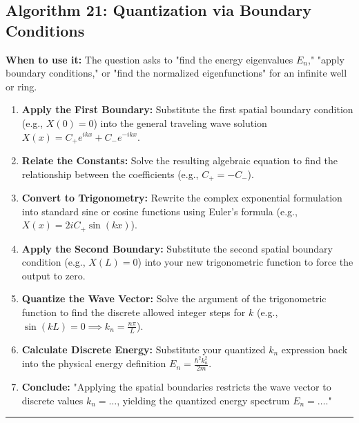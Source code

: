 \documentclass[11pt, a4paper]{report}
\begin{document}
\subsection*{Algorithm 21: Quantization via Boundary Conditions}
\textbf{When to use it:} The question asks to "find the energy eigenvalues $E_n$," "apply boundary conditions," or "find the normalized eigenfunctions" for an infinite well or ring.
\begin{enumerate}[label=\textbf{\arabic*.}]
    \item \textbf{Apply the First Boundary:} Substitute the first spatial boundary condition (e.g., $X(0) = 0$) into the general traveling wave solution $X(x) = C_+ e^{ikx} + C_- e^{-ikx}$.
    \item \textbf{Relate the Constants:} Solve the resulting algebraic equation to find the relationship between the coefficients (e.g., $C_+ = -C_-$).
    \item \textbf{Convert to Trigonometry:} Rewrite the complex exponential formulation into standard sine or cosine functions using Euler's formula (e.g., $X(x) = 2iC_+\sin(kx)$).
    \item \textbf{Apply the Second Boundary:} Substitute the second spatial boundary condition (e.g., $X(L) = 0$) into your new trigonometric function to force the output to zero.
    \item \textbf{Quantize the Wave Vector:} Solve the argument of the trigonometric function to find the discrete allowed integer steps for $k$ (e.g., $\sin(kL) = 0 \implies k_n = \frac{n\pi}{L}$).
    \item \textbf{Calculate Discrete Energy:} Substitute your quantized $k_n$ expression back into the physical energy definition $E_n = \frac{\hbar^2 k_n^2}{2m}$.
    \item \textbf{Conclude:} "Applying the spatial boundaries restricts the wave vector to discrete values $k_n = \dots$, yielding the quantized energy spectrum $E_n = \dots$."
\end{enumerate}
\vspace{1em}
\noindent\rule{\textwidth}{0.4pt}
\vspace{1em}
\end{document}
